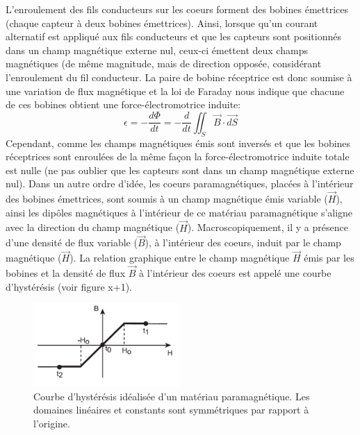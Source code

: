 \documentclass{standalone}
\begin{document}
L'enroulement des fils conducteurs sur les coeurs forment des bobines émettrices (chaque capteur à deux bobines émettrices). Ainsi, lorsque qu'un courant alternatif est appliqué aux fils conducteurs et que les capteurs sont positionnés dans un champ magnétique externe nul, ceux-ci émettent deux champs magnétiques (de même magnitude, mais de direction opposée, considérant l'enroulement du fil conducteur. La paire de bobine réceptrice est donc soumise à une variation de flux magnétique et la loi de Faraday nous indique que chacune de ces bobines obtient une force-électromotrice induite:
\[ \epsilon = -\frac{d \Phi}{dt} = -\frac{d}{dt} \iint_S  \vec{B}  \cdot \vec{dS}  \]  
Cependant, comme les champs magnétiques émis sont inversés et que les bobines réceptrices sont enroulées de la même façon la force-électromotrice induite totale est nulle (ne pas oublier que les capteurs sont dans un champ magnétique externe nul). Dans un autre ordre d'idée, les coeurs paramagnétiques, placées à l'intérieur des bobines émettrices, sont soumis à un champ magnétique émis variable ($\vec{H}$), ainsi les dipôles magnétiques à l'intérieur de ce matériau paramagnétique s'aligne avec la direction du champ magnétique ($\vec{H}$). Macroscopiquement, il y a présence d'une densité de flux variable ($\vec{B}$), à l'intérieur des coeurs, induit par le champ magnétique ($\vec{H}$). La relation graphique entre le champ magnétique $\vec{H}$ émis par les bobines et la densité de flux $\vec{B}$ à l'intérieur des coeurs est appelé une courbe d'hystérésis (voir figure x+1).  
  
\begin{figure}[h]
\begin{center}
\includegraphics[width=0.50\textwidth]{hysteresis}
\caption{Courbe d'hystérésis idéalisée d'un matériau paramagnétique. Les domaines linéaires et constants sont symmétriques par rapport à l'origine.}
\end{center}
\end{figure}  
\end{document}
